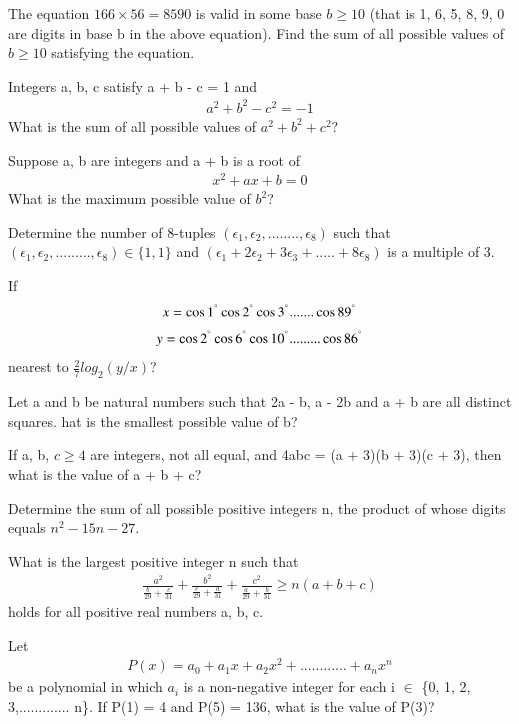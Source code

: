 \item The equation $166 \times 56 = 8590$ is valid in some base  $b \geq 10$ (that is 1, 6, 5, 8, 9, 0 are digits in base b in the above equation). Find the sum of all possible values of  $b \geq 10$ satisfying the equation.

\item Integers a, b, c satisfy a + b - c = 1 and 
\begin{align}
a^{2} + b^{2} - c^{2} = - 1
\end{align}
What is the sum of all possible values of $a^2 + b^2 + c^2$?

\item Suppose a, b are integers and a + b is a root of 
\begin{align}
x^2 + ax + b = 0
\end{align}
What is the maximum possible value of $b^{2}$?

\item Determine the number of 8-tuples $(\epsilon_1, \epsilon_2,........,\epsilon_8)$ such that $(\epsilon_1,\epsilon_2,.........,\epsilon_8) \in \{1, 1\}$ and
$(\epsilon_1 + 2\epsilon_2 + 3\epsilon_3 +.....+ 8\epsilon_8)$ is a multiple of 3.

\item If 
\begin{align*}
x = \cos 1^{\degree} \cos 2^{\degree} \cos 3^{\degree}.......\cos89^{\degree}
\end{align*}
\begin{align*} 
y= \cos 2^{\degree}\cos6^{\degree}\cos10^{\degree}.........\cos 86^{\degree}
\end{align*}
nearest to $\frac{2}{7} log_{2} (y/x)$?

\item Let a and b be natural numbers such that 2a - b, a - 2b and a + b are all distinct squares. hat is the smallest possible value of b?

\item If a, b, $c \geq 4$ are integers, not all equal, and 4abc = (a + 3)(b + 3)(c + 3), then what is the value of a + b + c?

\item Determine the sum of all possible positive integers n, the product of whose digits equals $n^2 - 15n - 27$.

\item What is the largest positive integer n such that
\begin{align*}
\frac{a^{2}}{\frac{b}{29} + \frac{c}{31}} + \frac{b^2}{\frac{c}{29} + \frac{a}{31}} + \frac{c^2}{\frac{a}{29} + \frac{b}{31}} \geq n(a + b + c)
\end{align*}
holds for all positive real numbers a, b, c.

\item Let
\begin{align*} 
P(x) = a_0 + a_1 x + a_2 x^2 +............+ a_n x^n
\end{align*}
be a polynomial in which $a_i$ is a non-negative integer for each i $\in$  \{0, 1, 2, 3,............. n\}. If P(1) = 4 and P(5) = 136, what is the value of P(3)?
